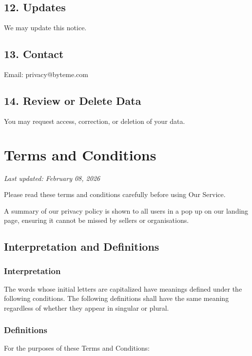 \documentclass[11pt, a4paper]{report}
\begin{document}
\begin{itemize}
\section*{12. Updates}
We may update this notice.

\section*{13. Contact}
Email: privacy@byteme.com

\section*{14. Review or Delete Data}
You may request access, correction, or deletion of your data.

\chapter{Terms and Conditions}
\textit{Last updated: February 08, 2026}
\bigskip

Please read these terms and conditions carefully before using Our Service.

A summary of our privacy policy is shown to all users in a pop up on our landing page, ensuring it cannot be missed by sellers or organisations.

\section*{Interpretation and Definitions}

\subsection*{Interpretation}
The words whose initial letters are capitalized have meanings defined under the following conditions. The following definitions shall have the same meaning regardless of whether they appear in singular or plural.

\subsection*{Definitions}
For the purposes of these Terms and Conditions:


\end{itemize}
\end{document}
